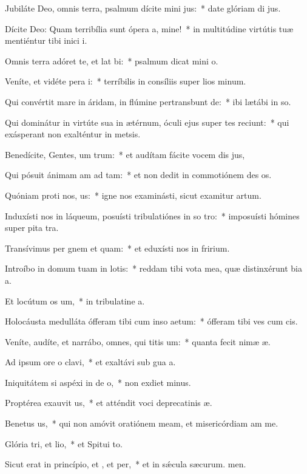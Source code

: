 \item Jubiláte Deo, omnis terra, psalmum dícite mini jus:~* date glóriam di jus.
\item Dícite Deo: Quam terribília sunt ópera a, mine!~* in multitúdine virtútis tuæ mentiéntur tibi inici i.
\item Omnis terra adóret te, et lat bi:~* psalmum dicat mini o.
\item Veníte, et vidéte pera i:~* terríbilis in consíliis super lios minum.
\item Qui convértit mare in áridam, in flúmine pertransbunt de:~* ibi lætábi in so.
\item Qui dominátur in virtúte sua in ætérnum, óculi ejus super tes reciunt:~* qui exásperant non exalténtur in metsis.
\item Benedícite, Gentes, um trum:~* et audítam fácite vocem dis jus,
\item Qui pósuit ánimam am ad tam:~* et non dedit in commotiónem des os.
\item Quóniam proti nos, us:~* igne nos examinásti, sicut examitur artum.
\item Induxísti nos in láqueum, posuísti tribulatiónes in so tro:~* imposuísti hómines super pita tra.
\item Transívimus per gnem et quam:~* et eduxísti nos in fririum.
\item Introíbo in domum tuam in lotis:~* reddam tibi vota mea, quæ distinxérunt bia a.
\item Et locútum  os um,~* in tribulatine a.
\item Holocáusta medulláta ófferam tibi cum inso aetum:~* ófferam tibi ves cum cis.
\item Veníte, audíte, et narrábo, omnes, qui titis um:~* quanta fecit nimæ æ.
\item Ad ipsum ore o clavi,~* et exaltávi sub gua a.
\item Iniquitátem si aspéxi in de o,~* non exdiet minus.
\item Proptérea exauvit us,~* et atténdit voci deprecatinis æ.
\item Benetus us,~* qui non amóvit oratiónem meam, et misericórdiam am  me.
\item Glória tri, et lio,~* et Spitui to.
\item Sicut erat in princípio, et , et per,~* et in sǽcula sæcurum. men.
